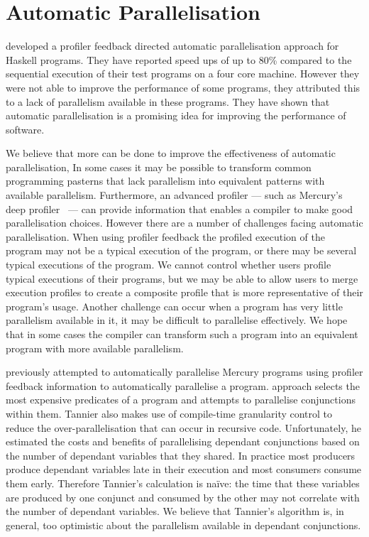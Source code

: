 \section{Automatic Parallelisation}
\label{sec:intro_auto_par}

\citet{harris_07_feedback_imp_par} developed a profiler
feedback directed automatic parallelisation approach for Haskell programs.
They have reported speed ups of up to 80\% compared to the sequential
execution of their test programs on a four core machine.
However they were not able to improve the performance of some
programs, they attributed this to a lack of parallelism
available in these programs.
They have shown that automatic parallelisation is a promising idea for
improving the performance of software.

We believe that more can be done to improve the effectiveness of
automatic parallelisation,
In some cases it may be possible to transform common programming
pasterns that lack parallelism into equivalent patterns with available
parallelism.
Furthermore, an advanced profiler --- such as Mercury's deep
profiler~\citep{conway:2001:mercury-deep} --- can provide information
that enables a compiler to make good parallelisation choices.
However there are a number of challenges facing automatic
parallelisation.
When using profiler feedback the profiled execution of the program may
not be a typical execution of the program, or there may be several
typical executions of the program.
We cannot control whether users profile typical executions of their
programs, but we may be able to allow users to merge execution
profiles to create a composite profile that is more representative of
their program's usage.
Another challenge can occur when a program has very little parallelism
available in it, it may be difficult to parallelise effectively.
We hope that in some cases the compiler can transform such a program
into an equivalent program with more available parallelism.

\citet{tannier:2007:parallel_mercury} previously attempted to automatically
parallelise Mercury programs using profiler feedback
information to automatically parallelise a program.
\citet{tannier:2007:parallel_mercury} approach selects the most expensive predicates
of a program and attempts to parallelise conjunctions within them.
Tannier also makes use of compile-time granularity
control to reduce the over-parallelisation that can occur in recursive
code.
Unfortunately, he estimated the costs and benefits of parallelising
dependant conjunctions based on the number of dependant variables that
they shared.
In practice most producers produce dependant variables late in their
execution and most consumers consume them early.
Therefore Tannier's calculation is na\"ive: the time that these
variables are produced by one conjunct and consumed by the other may
not correlate with the number of dependant variables.
We believe that Tannier's algorithm is, in general, too optimistic
about the parallelism available in dependant conjunctions.

